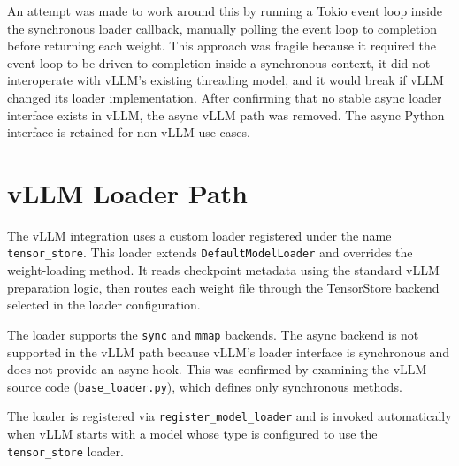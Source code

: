 An attempt was made to work around this by running a Tokio event loop inside the synchronous loader callback, manually polling the event loop to completion before returning each weight. This approach was fragile because it required the event loop to be driven to completion inside a synchronous context, it did not interoperate with vLLM's existing threading model, and it would break if vLLM changed its loader implementation. After confirming that no stable async loader interface exists in vLLM, the async vLLM path was removed. The async Python interface is retained for non-vLLM use cases.

\section{vLLM Loader Path}

The vLLM integration uses a custom loader registered under the name \texttt{tensor\_store}. This loader extends \texttt{DefaultModelLoader} and overrides the weight-loading method. It reads checkpoint metadata using the standard vLLM preparation logic, then routes each weight file through the TensorStore backend selected in the loader configuration.

The loader supports the \texttt{sync} and \texttt{mmap} backends. The async backend is not supported in the vLLM path because vLLM's loader interface is synchronous and does not provide an async hook. This was confirmed by examining the vLLM source code (\texttt{base\_loader.py}), which defines only synchronous methods.

The loader is registered via \texttt{register\_model\_loader} and is invoked automatically when vLLM starts with a model whose type is configured to use the \texttt{tensor\_store} loader.
